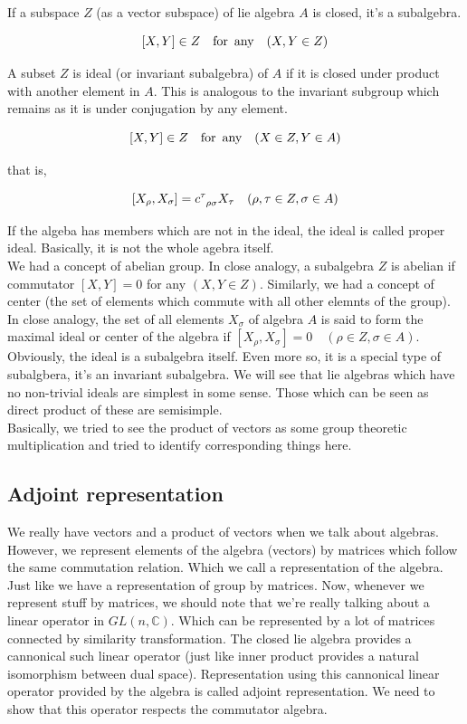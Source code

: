 \documentclass{report}
\begin{document}
If a subspace $Z$ (as a vector subspace) of lie algebra $A$ is closed, it's a subalgebra.

$$[X,Y]\in Z \quad \textrm{for\, any} \quad (X,Y \in Z)$$

\noindent A subset $Z$ is ideal (or invariant subalgebra) of $A$ if it is closed under product with another element in $A$. This is analogous to the invariant subgroup which remains as it is under conjugation by any element.

$$[X,Y]\in Z \quad \textrm{for\, any} \quad (X\in Z, Y \in A)$$

\noindent that is,

$$[X_ \rho, X_ \sigma] = c\indices{^\tau_ \rho_\sigma}X_\tau \quad (\rho,\tau \in Z, \sigma\in A)$$

\noindent If the algeba has members which are not in the ideal, the ideal is called proper ideal. Basically, it is not the whole agebra itself.\\ 

\noindent We had a concept of abelian group. In close analogy, a subalgebra $Z$ is abelian if commutator $[X,Y]=0$ for any $(X,Y \in Z)$. Similarly, we had a concept of center (the set of elements which commute with all other elemnts of the group). In close analogy, the set of all elements $X_\sigma$ of algebra $A$ is said to form the maximal ideal or center of the algebra if $[X_ \rho, X_\sigma] = 0 \quad (\rho\in Z, \sigma\in A)$.\\

\noindent Obviously, the ideal is a subalgebra itself. Even more so, it is a special type of subalgbera, it's an invariant subalgebra. We will see that lie algebras which have no non-trivial ideals are simplest in some sense. Those which can be seen as direct product of these are semisimple.\\

\noindent Basically, we tried to see the product of vectors as some group theoretic multiplication and tried to identify corresponding things here.


\subsection{Adjoint representation}

\noindent We really have vectors and a product of vectors when we talk about algebras. However, we represent elements of the algebra (vectors) by matrices which follow the same commutation relation. Which we call a representation of the algebra. Just like we have a representation of group by matrices. Now, whenever we represent stuff by matrices, we should note that we're really talking about a linear operator in $GL(n,\mathbb{C})$. Which can be represented by a lot of matrices connected by similarity transformation. The closed lie algebra provides a cannonical such linear operator (just like inner product provides a natural isomorphism between dual space). Representation using this cannonical linear operator provided by the algebra is called adjoint representation. We need to show that this operator respects the commutator algebra.
\end{document}
